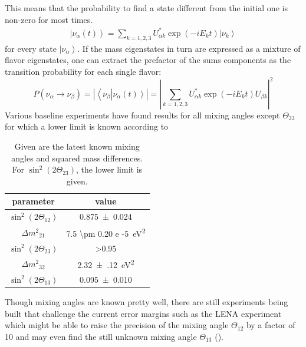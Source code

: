 	This means that the probability to find a state different from the initial one is non-zero for most times.
	\begin{equation}
		\begin{split}
			\left|\nu_\alpha(t)\right> = \sum_{k = 1,2,3} U^*_{\alpha k}\exp\left(-iE_k t\right)\left|\nu_k\right>
		\end{split}
	\end{equation}
	for every state $\left|\nu_\alpha\right>$. If the mass eigenstates in turn are expressed as a mixture of flavor eigenstates, one can extract the prefactor of the sums components as the transition probability for each single flavor:
	\begin{equation}
		P(\nu_\alpha \rightarrow\nu_\beta) = \left| \left<\nu_\beta\right|\left.\nu_\alpha(t)\right>\right|= \left|\sum_{k=1,2,3}U^*_{\alpha k} \exp{\left(-iE_kt\right)}U_{\beta k}\right|^2
	\end{equation}
	Various baseline experiments have found results for all mixing angles except $\Theta_{23}$ for which a lower limit is known according to \cite{reviewOfParticlePhysics}
	\begin{table}
	\centering
		\begin{tabular}{|c|c|}
		\hline
			parameter & value\\
			\hline			
			$\sin^2{\left(2\Theta_{12}\right)}$& \SI{0.875\pm 0.024}{}\\
			$\Delta {m^2}_{21}$&\SI{7.5 \pm 0.20 e -5}{\square\electronvolt}\\
			$\sin^2{\left(2\Theta_{23}\right)}$& >\SI{0.95}{}\\
			$\Delta {m^2}_{32}$ & \SI{2.32(12)}{\square\electronvolt} \\
			$\sin^2{\left(2\Theta_{13}\right)}$ & \SI{0.095\pm0.010}{}\\
			\hline
		\end{tabular}
		\caption[Neutrino parameters]{Given are the latest known mixing angles and squared mass differences. For $\sin^2{\left(2\Theta_{23}\right)}$, the lower limit is given.}
		Though mixing angles are known pretty well, there are still experiments being built that challenge the current error margins such as the LENA experiment which might be able to raise the precision of the mixing angle $\Theta_{12}$ by a factor of 10 and  may even find the still unknown mixing angle $\Theta_{13}$ (\cite{LENA}).
		\label{tab:neutrinoParameters}
	\end{table}
	
